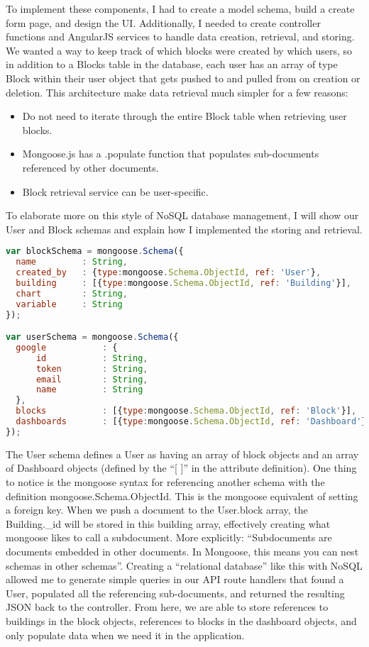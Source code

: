 \documentclass[letterpaper,10pt,serif,draftclsnofoot,onecolumn,compsoc,titlepage]{IEEEtran}
\begin{document}
\noindent To implement these components, I had to create a model schema, build a create form page, and design the UI. Additionally, I needed to create controller functions and AngularJS services to handle data creation, retrieval, and storing. We wanted a way to keep track of which blocks were created by which users, so in addition to a Blocks table in the database, each user has an array of type Block within their user object that gets pushed to and pulled from on creation or deletion. This architecture make data retrieval much simpler for a few reasons:
\begin{itemize}
  \item Do not need to iterate through the entire Block table when retrieving user blocks.
  \item Mongoose.js has a .populate function that populates sub-documents referenced by other documents. 
  \item Block retrieval service can be user-specific.
\end{itemize}
To elaborate more on this style of NoSQL database management, I will show our User and Block schemas and explain how I implemented the storing and retrieval.
\begin{lstlisting}[language=JavaScript]
var blockSchema = mongoose.Schema({
  name         : String,
  created_by   : {type:mongoose.Schema.ObjectId, ref: 'User'},
  building     : [{type:mongoose.Schema.ObjectId, ref: 'Building'}],
  chart        : String,
  variable     : String
});

var userSchema = mongoose.Schema({
  google           : {
      id           : String,
      token        : String,
      email        : String,
      name         : String
  },
  blocks           : [{type:mongoose.Schema.ObjectId, ref: 'Block'}],
  dashboards       : [{type:mongoose.Schema.ObjectId, ref: 'Dashboard'}]
});
\end{lstlisting}
The User schema defines a User as having an array of block objects and an array of Dashboard objects (defined by the ``[ ]'' in the attribute definition). One thing to notice is the mongoose syntax for referencing another schema with the definition mongoose.Schema.ObjectId. This is the mongoose equivalent of setting a foreign key. When we push a document to the User.block array, the Building.\_id will be stored in this building array, effectively creating what mongoose likes to call a subdocument. More explicitly: ``Subdocuments are documents embedded in other documents. In Mongoose, this means you can nest schemas in other schemas''\cite{mongoose}. Creating a ``relational database'' like this with NoSQL allowed me to generate simple queries in our API route handlers that found a User, populated all the referencing sub-documents, and returned the resulting JSON back to the controller. From here, we are able to store references to buildings in the block objects, references to blocks in the dashboard objects, and only populate data when we need it in the application. 
\end{document}
